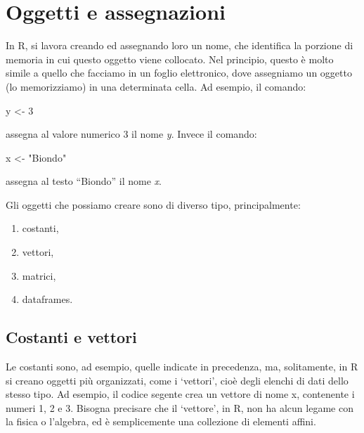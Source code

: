 \documentclass[a4paper,12pt,oneside]{book}
\providecommand{\tightlist}{%
  \setlength{\itemsep}{0pt}\setlength{\parskip}{0pt}}
\newenvironment{Shaded}{\begin{snugshade}}{\end{snugshade}}
\newcommand{\DecValTok}[1]{#1}
\newcommand{\StringTok}[1]{#1}
\newcommand{\OtherTok}[1]{#1}
\newcommand{\NormalTok}[1]{#1}
\begin{document}
\hypertarget{oggetti-e-assegnazioni}{%
\section{Oggetti e assegnazioni}\label{oggetti-e-assegnazioni}}

In R, si lavora creando ed assegnando loro un nome, che identifica la porzione di memoria in cui questo oggetto viene collocato. Nel principio, questo è molto simile a quello che facciamo in un foglio elettronico, dove assegniamo un oggetto (lo memorizziamo) in una determinata cella. Ad esempio, il comando:

\begin{Shaded}
\begin{Highlighting}[]
\NormalTok{y  }\OtherTok{\textless{}{-}}  \DecValTok{3}
\end{Highlighting}
\end{Shaded}

assegna al valore numerico 3 il nome \emph{y}. Invece il comando:

\begin{Shaded}
\begin{Highlighting}[]
\NormalTok{x  }\OtherTok{\textless{}{-}}  \StringTok{"Biondo"}
\end{Highlighting}
\end{Shaded}

assegna al testo ``Biondo'' il nome \emph{x}.

Gli oggetti che possiamo creare sono di diverso tipo, principalmente:

\begin{enumerate}
\def\labelenumi{\arabic{enumi}.}
\tightlist
\item
  costanti,
\item
  vettori,
\item
  matrici,
\item
  dataframes.
\end{enumerate}

\hypertarget{costanti-e-vettori}{%
\subsection{Costanti e vettori}\label{costanti-e-vettori}}

Le costanti sono, ad esempio, quelle indicate in precedenza, ma, solitamente, in R si creano oggetti più organizzati, come i `vettori', cioè degli elenchi di dati dello stesso tipo. Ad esempio, il codice segente crea un vettore di nome x, contenente i numeri 1, 2 e 3. Bisogna precisare che il `vettore', in R, non ha alcun legame con la fisica o l'algebra, ed è semplicemente una collezione di elementi affini.
\end{document}
